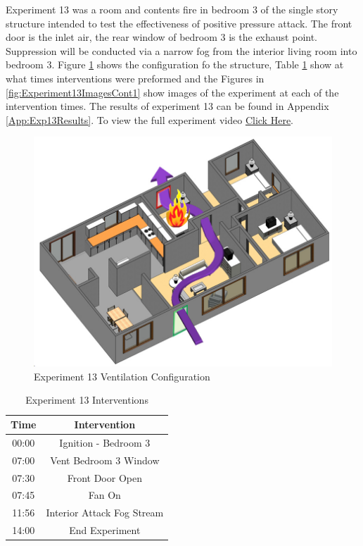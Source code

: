 \documentclass{article}
\begin{document}
Experiment 13 was a room and contents fire in bedroom 3 of the single story structure intended to test the effectiveness of positive pressure attack. The front door is the inlet air, the rear window of bedroom 3 is the exhaust point. Suppression will be conducted via a narrow fog from the interior living room into bedroom 3. Figure \ref{fig:Exp13VentConfig} shows the configuration fo the structure, Table \ref{Table:Exp13Interventions} show at what times interventions were preformed and the Figures in \ref{fig:Experiment13ImagesCont1} show images of the experiment at each of the intervention times. The results of experiment 13 can be found in Appendix \ref{App:Exp13Results}. To view the full experiment video \href{https://youtu.be/bMQUpJWIFus}{Click Here}.

\begin{figure}[H]
	\centering
	\includegraphics[width=5in]{0_Images/FireExperiments/Single_Story/Experiment_13.jpg}
	\caption{Experiment 13 Ventilation Configuration}
	\label{fig:Exp13VentConfig}
\end{figure}

\begin{table}[H]
	\centering
	\caption{Experiment 13 Interventions}
	\begin{tabular}{|c|c|} 
		\hline
		Time & Intervention \\ \hline \hline
		00:00 & Ignition - Bedroom 3\\ \hline
		07:00 & Vent Bedroom 3 Window \\ \hline
		07:30 & Front Door Open \\ \hline
		07:45 & Fan On \\ \hline
		11:56 & Interior Attack Fog Stream \\ \hline
		14:00 & End Experiment \\ \hline
	\end{tabular}
	\label{Table:Exp13Interventions}
\end{table}
\end{document}

